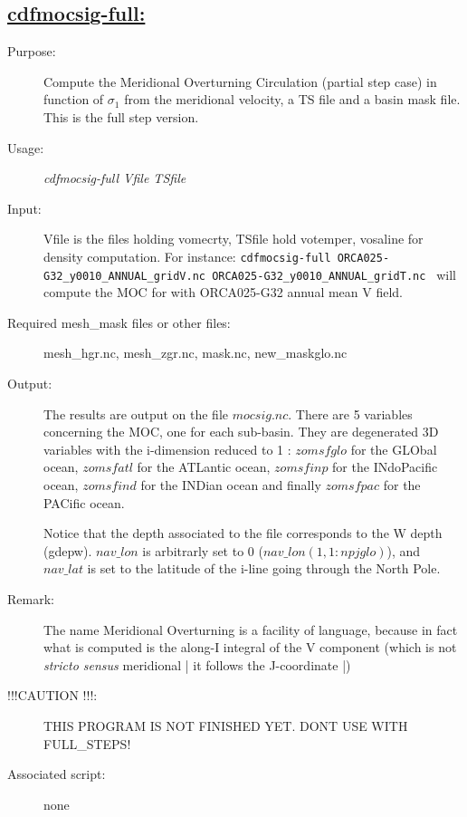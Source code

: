 \documentclass[a4paper,11pt]{article}
\begin{document}
\subsection*{\underline{cdfmocsig-full:}}
\begin{description}
\item[Purpose:] Compute the Meridional Overturning Circulation (partial step case) in function of $\sigma_1$  from the meridional velocity, a TS file and a basin mask file. This is the full step version.
\item[Usage:] {\em cdfmocsig-full  Vfile TSfile}
\item[Input:] Vfile is the files holding vomecrty, TSfile hold votemper, vosaline for density computation.
For instance: {\tt cdfmocsig-full ORCA025-G32\_y0010\_ANNUAL\_gridV.nc ORCA025-G32\_y0010\_ANNUAL\_gridT.nc }
will compute the MOC for with ORCA025-G32 annual mean V field.
\item[Required mesh\_mask files or other files:]   mesh\_hgr.nc, mesh\_zgr.nc, mask.nc, new\_maskglo.nc   \\
\item[Output:] The results are output on the file $mocsig.nc$. There are 5 variables concerning the MOC, one for each sub-basin. They are degenerated 3D variables with the i-dimension
reduced to 1 : $zomsfglo$ for the GLObal ocean,
$zomsfatl$ for the ATLantic ocean, $zomsfinp$ for the INdoPacific ocean, $zomsfind$ for the INDian ocean and finally
$zomsfpac$ for the PACific ocean. 

Notice that the depth associated to the file corresponds to the W depth (gdepw). $nav\_lon$ is arbitrarly set to 0 ($nav\_lon(1,1:npjglo)$),
and $nav\_lat$ is set to the latitude of the i-line going through the North Pole.
\item[Remark:]  The name Meridional Overturning is a facility of language, because in fact what is computed is the along-I integral
of the V component (which is not {\em stricto sensus} meridional | it follows the J-coordinate |)
\item[!!!CAUTION !!!:] THIS PROGRAM IS NOT FINISHED YET. DONT USE WITH FULL\_STEPS!
\item[Associated script:] none
\end{description}


\newpage
\end{document}
